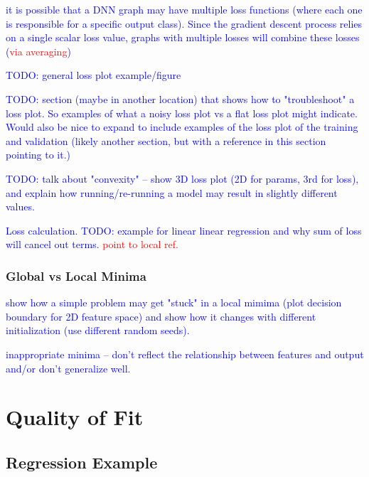 \textcolor{blue}{it is possible that a DNN graph may have multiple loss functions (where each one is responsible for a specific output class). Since the gradient descent process relies on a single scalar loss value, graphs with multiple losses will combine these losses (\textcolor{red}{via averaging})}

\textcolor{blue}{TODO: general loss plot example/figure}

\textcolor{blue}{TODO: section (maybe in another location) that shows how to "troubleshoot" a loss plot. So examples of what a noisy loss plot vs a flat loss plot might indicate. Would also be nice to expand to include examples of the loss plot of the training and validation (likely another section, but with a reference in this section pointing to it.)}

\textcolor{blue}{TODO: talk about "convexity" -- show 3D loss plot (2D for params, 3rd for loss), and explain how running/re-running a model may result in slightly different values.}

\textcolor{blue}{Loss calculation. TODO: example for linear linear regression and why sum of loss will cancel out terms. \textcolor{red}{point to local ref.}}

\subsubsection{Global vs Local Minima}

\textcolor{blue}{show how a simple problem may get "stuck" in a local mimima (plot decision boundary for 2D feature space) and show how it changes with different initialization (use different random seeds). }

\textcolor{blue}{{inappropriate minima} -- don't reflect the relationship between features and output and/or don't generalize well.}

\section{Quality of Fit}


\subsection{Regression Example}


